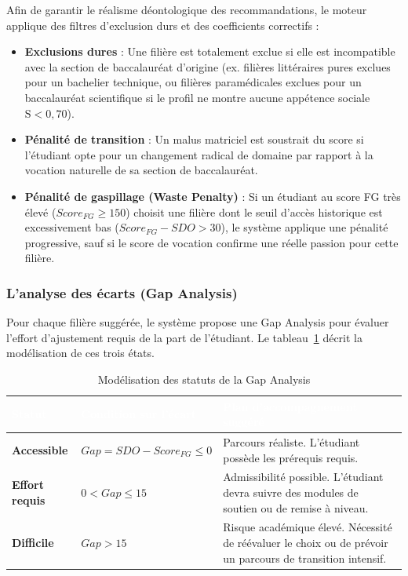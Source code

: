 Afin de garantir le réalisme déontologique des recommandations, le moteur applique des filtres d'exclusion durs et des coefficients correctifs :
\begin{itemize}
    \item \textbf{Exclusions dures} : Une filière est totalement exclue si elle est incompatible avec la section de baccalauréat d'origine (ex. filières littéraires pures exclues pour un bachelier technique, ou filières paramédicales exclues pour un baccalauréat scientifique si le profil ne montre aucune appétence sociale $\text{S} < 0{,}70$).
    \item \textbf{Pénalité de transition} : Un malus matriciel est soustrait du score si l'étudiant opte pour un changement radical de domaine par rapport à la vocation naturelle de sa section de baccalauréat.
    \item \textbf{Pénalité de gaspillage (Waste Penalty)} : Si un étudiant au score FG très élevé ($Score_{FG} \ge 150$) choisit une filière dont le seuil d'accès historique est excessivement bas ($Score_{FG} - SDO > 30$), le système applique une pénalité progressive, sauf si le score de vocation confirme une réelle passion pour cette filière.
\end{itemize}

\subsubsection{L'analyse des écarts (Gap Analysis)}

Pour chaque filière suggérée, le système propose une Gap Analysis pour évaluer l'effort d'ajustement requis de la part de l'étudiant. Le tableau~\ref{tab:gapanalysis} décrit la modélisation de ces trois états.

\begin{table}[H]
\centering
\small
\begin{tabular}{|p{3cm}|p{4.5cm}|p{7cm}|}
\hline
\rowcolor{headercolor} 
\textcolor{white}{\textbf{Statut}} & \textcolor{white}{\textbf{Condition sur l'écart}} & \textcolor{white}{\textbf{Plan d'accompagnement suggéré}} \\
\hline
\textbf{Accessible} & $Gap = SDO - Score_{FG} \le 0$ & Parcours réaliste. L'étudiant possède les prérequis requis. \\
\hline
\rowcolor{rowgray}
\textbf{Effort requis} & $0 < Gap \le 15$ & Admissibilité possible. L'étudiant devra suivre des modules de soutien ou de remise à niveau. \\
\hline
\textbf{Difficile} & $Gap > 15$ & Risque académique élevé. Nécessité de réévaluer le choix ou de prévoir un parcours de transition intensif. \\
\hline
\end{tabular}
\caption{Modélisation des statuts de la Gap Analysis}
\label{tab:gapanalysis}
\end{table}

